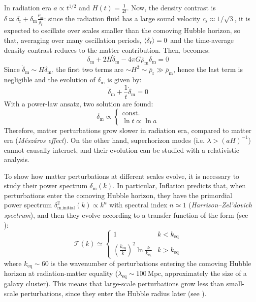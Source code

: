 In radiation era $ a \propto t^{1/2} $ and $ H(t) = \frac{1}{2t} $. Now, the density contrast is $ \delta \simeq \delta_\text{r} + \delta_\text{m} \frac{\bar{\rho}_\text{m}}{\bar{\rho}_\text{r}} $: since the radiation fluid has a large sound velocity $ c_\text{s} \approx 1 / \sqrt{3} $, it is expected to oscillate over scales smaller than the comoving Hubble horizon, so that, averaging over many oscillation periods, $ \braket{\delta_\text{r}} = 0 $ and the time-average density contrast reduces to the matter contribution. Then,  becomes:
\begin{equation*}
  \ddot{\delta}_\text{m} + 2 H \dot{\delta}_\text{m} - 4\pi G \bar{\rho}_\text{m} \delta_\text{m} = 0
\end{equation*}
Since $ \dot{\delta}_\text{m} \sim H \delta_\text{m} $, the first two terms are $ \sim H^2 \sim \bar \rho_\text{r} \gg \bar \rho_\text{m} $, hence the last term is negligible and the evolution of $ \delta_\text{m} $ is given by:
\begin{equation}
  \ddot{\delta}_\text{m} + \frac{1}{t} \dot{\delta}_\text{m} = 0
\end{equation}
With a power-law ansatz, two solution are found:
\begin{equation}
  \delta_\text{m} \propto
  \begin{cases}
    \text{const.} \\
    \ln t \propto \ln a
  \end{cases}
\end{equation}
Therefore, matter perturbations grow slower in radiation era, compared to matter era (\emph{Mészáros effect}). On the other hand, superhorizon modes (i.e. $ \lambda > (aH)^{-1} $) cannot causally interact, and their evolution can be studied with a relativistic analysis.

To show how matter perturbations at different scales evolve, it is necessary to study their power spectrum $ \delta_\text{m}(k) $. In particular, Inflation predicts that, when perturbations enter the comoving Hubble horizon, they have the primordial power spectrum $ \delta_\text{m,initial}^2(k) \propto k^n $ with spectral index $ n \simeq 1 $ (\emph{Harrison--Zel'dovich spectrum}), and then they evolve according to a transfer function of the form (see ):
\begin{equation}
  \mathcal{T}(k) \simeq
  \begin{cases}
    1 & k < k_\text{eq} \\
    \left( \frac{k_\text{eq}}{k} \right)^2 \ln \frac{k}{k_\text{eq}} & k > k_\text{eq}
  \end{cases}
\end{equation}
where $ k_\text{eq} \sim 60 $ is the wavenumber of perturbations entering the comoving Hubble horizon at radiation-matter equality ($ \lambda_\text{eq} \sim 100 \,\text{Mpc} $, approximately the size of a galaxy cluster). This means that large-scale perturbations grow less than small-scale perturbations, since they enter the Hubble radius later (see ).

